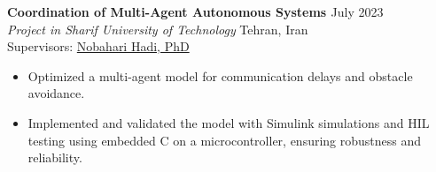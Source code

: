 \documentclass[12pt]{article}
\begin{document}

\noindent
{\bfseries Coordination of Multi-Agent Autonomous Systems
\href{https://github.com/alibaniasad1999/Coordination-of-Multi-Agent-Autonomous-Systems}{\faGithub}
} \hfill July 2023 \\[2pt]
\noindent \textit{Project in Sharif University of Technology} \hfill Tehran, Iran \\[2pt]
\noindent Supervisors:
\href{https://ae.sharif.edu/~portal/faculty/1091235256}{Nobahari Hadi, PhD}
\vspace{-4pt}
\begin{itemize}  \itemsep 1pt %
	\item Optimized a {multi-agent} model for {communication delays} and {obstacle avoidance}.

    \item Implemented and validated the model with {Simulink} simulations and {HIL} testing using {embedded C} on a {microcontroller}, ensuring robustness and reliability.
\end{itemize}
\end{document}
